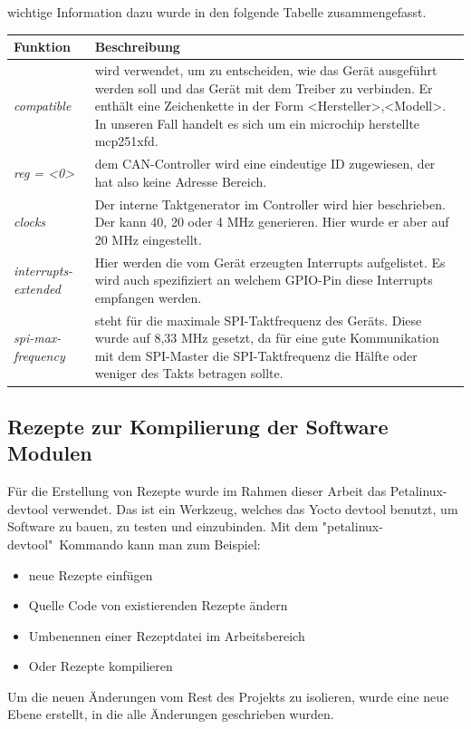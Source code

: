 wichtige Information dazu wurde in den folgende Tabelle zusammengefasst. 

\begin{tabular}{lp{11cm}}
	\toprule
	\textbf{Funktion} &\textbf{Beschreibung}\\
	\midrule
	\textit{compatible} & wird verwendet, um zu entscheiden, wie das Gerät ausgeführt werden soll und das Gerät mit dem Treiber zu verbinden. Er enthält eine Zeichenkette in der Form <Hersteller>,<Modell>. In unseren Fall handelt es sich um ein microchip herstellte mcp251xfd.\\
	\textit{reg = <0>} & dem CAN-Controller wird eine eindeutige ID zugewiesen, der hat  also keine Adresse Bereich. \\
	\textit{clocks} & Der interne Taktgenerator im Controller wird hier beschrieben. Der kann 40, 20 oder 4 MHz generieren. Hier wurde er aber auf 20 MHz eingestellt.\\
	\textit{interrupts-extended} & Hier werden die vom Gerät erzeugten Interrupts aufgelistet. Es wird auch spezifiziert an welchem GPIO-Pin diese Interrupts empfangen werden.\\
	\textit{spi-max-frequency} & steht für die maximale SPI-Taktfrequenz des Geräts. Diese wurde auf 8,33 MHz gesetzt, da für eine gute Kommunikation mit dem SPI-Master die SPI-Taktfrequenz die Hälfte oder weniger des Takts betragen sollte. \\
	\bottomrule
\end{tabular}

\subsection{Rezepte zur Kompilierung der Software Modulen}
Für die Erstellung von Rezepte wurde im Rahmen dieser Arbeit das Petalinux-devtool verwendet. Das ist ein Werkzeug, welches das Yocto devtool benutzt, um Software zu bauen, zu testen und einzubinden. Mit dem "petalinux-devtool"\ Kommando kann man zum Beispiel:
\begin{itemize}
	\item neue Rezepte einfügen
	\item Quelle Code von existierenden Rezepte ändern
	\item Umbenennen einer Rezeptdatei im Arbeitsbereich
	\item Oder Rezepte kompilieren 
\end{itemize}

Um die neuen Änderungen vom Rest des Projekts zu isolieren, wurde eine neue Ebene erstellt, in die alle Änderungen geschrieben wurden.

